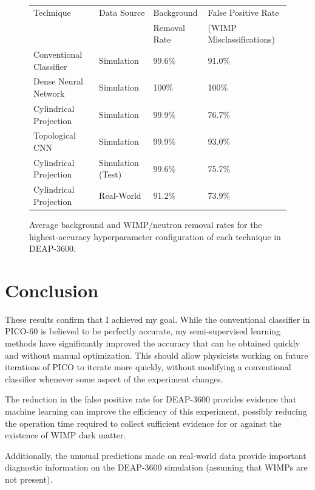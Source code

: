 \documentclass[12pt]{article}
\begin{document}
\begin{figure}[ht]
    \centering
    \begin{tabular}[b]{|l|l|l|l|}
        \hline
        \rowcolor{lightcyan}
        Technique & Data Source & Background & False Positive Rate \\
        \rowcolor{lightcyan}
        & & Removal Rate & (WIMP Misclassifications) \\
        \hline
        Conventional Classifier & Simulation & 99.6\% & 91.0\% \\
        \hline
        Dense Neural Network & Simulation & 100\% & 100\% \\
        \hline
        Cylindrical Projection & Simulation & 99.9\% & 76.7\% \\
        \hline
        Topological CNN & Simulation & 99.9\% & 93.0\% \\
        \hline
        Cylindrical Projection & Simulation (Test) & 99.6\% & 75.7\% \\
        \hline
        Cylindrical Projection & Real-World & 91.2\% & 73.9\% \\
        \hline
    \end{tabular}
    \caption{\label{deap_final_results} Average background and WIMP/neutron removal rates for the highest-accuracy hyperparameter configuration of each technique in DEAP-3600.}
\end{figure}

\section{Conclusion}

These results confirm that I achieved my goal. While the conventional classifier in PICO-60 is believed to be perfectly accurate, my semi-supervised learning methods have significantly improved the accuracy that can be obtained quickly and without manual optimization. This should allow physicists working on future iterations of PICO to iterate more quickly, without modifying a conventional classifier whenever some aspect of the experiment changes.

The reduction in the false positive rate for DEAP-3600 provides evidence that machine learning can improve the efficiency of this experiment, possibly reducing the operation time required to collect sufficient evidence for or against the existence of WIMP dark matter.

Additionally, the unusual predictions made on real-world data provide important diagnostic information on the DEAP-3600 simulation (assuming that WIMPs are not present).
\end{document}

